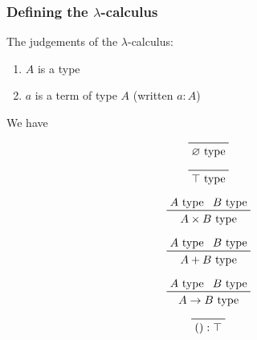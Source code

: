 \documentclass{beamer}
\begin{document}
\begin{frame}
  \frametitle{Defining the $\lambda$-calculus}
  The judgements of the $\lambda$-calculus:
  \begin{enumerate}
    \itemsep0.2em
    \item $A$ is a type
    \item $a$ is a term of type $A$ (written $a:A$)
  \end{enumerate}
  We have
  \vspace{-1em}
  \begin{center}
    \begin{minipage}[b]{0.20\linewidth}
      \begin{displaymath}
        \prftree[r]{}{}{\emptyset\text{ type}}
      \end{displaymath}
    \end{minipage}
    \begin{minipage}[b]{0.15\linewidth}
      \begin{displaymath}
        \prftree[r]{}{}{\top\text{ type}}
      \end{displaymath}
    \end{minipage}
    \begin{minipage}[b]{0.30\linewidth}
      \begin{displaymath}
        \prftree[r]{}{A\text{ type}}{B\text{ type}}{A\times B\text{ type}}
      \end{displaymath}
    \end{minipage}
    \begin{minipage}[b]{0.25\linewidth}
      \begin{displaymath}
        \prftree[r]{}{A\text{ type}}{B\text{ type}}{A+B\text{ type}}
      \end{displaymath}
    \end{minipage}
    \begin{minipage}[b]{0.25\linewidth}
      \begin{displaymath}
        \prftree[r]{}{A\text{ type}}{B\text{ type}}{A\to B\text{ type}}
      \end{displaymath}
    \end{minipage}
    \begin{minipage}[b]{0.15\linewidth}
      \begin{displaymath}
        \prftree[r]{}{}{():\top}
      \end{displaymath}
    \end{minipage}
    \begin{minipage}[b]{0.25\linewidth}
      \begin{displaymath}

\end{displaymath}
\end{minipage}
\end{center}
\end{frame}
\end{document}
